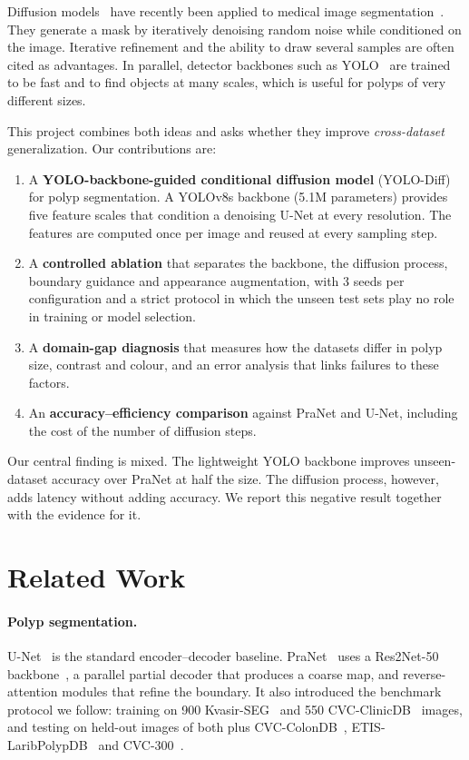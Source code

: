 \documentclass[10pt,twocolumn,letterpaper]{article}
\begin{document}
Diffusion models~\cite{ho2020ddpm,song2021ddim} have recently been applied to medical image segmentation~\cite{amit2021segdiff,wu2023medsegdiff}. They generate a mask by iteratively denoising random noise while conditioned on the image. Iterative refinement and the ability to draw several samples are often cited as advantages. In parallel, detector backbones such as YOLO~\cite{redmon2016yolo,jocher2023yolov8} are trained to be fast and to find objects at many scales, which is useful for polyps of very different sizes.

This project combines both ideas and asks whether they improve \emph{cross-dataset} generalization. Our contributions are:
\begin{enumerate}[nosep,leftmargin=*]
\item A \textbf{YOLO-backbone-guided conditional diffusion model} (YOLO-Diff) for polyp segmentation. A YOLOv8s backbone (5.1M parameters) provides five feature scales that condition a denoising U-Net at every resolution. The features are computed once per image and reused at every sampling step.
\item A \textbf{controlled ablation} that separates the backbone, the diffusion process, boundary guidance and appearance augmentation, with 3 seeds per configuration and a strict protocol in which the unseen test sets play no role in training or model selection.
\item A \textbf{domain-gap diagnosis} that measures how the datasets differ in polyp size, contrast and colour, and an error analysis that links failures to these factors.
\item An \textbf{accuracy--efficiency comparison} against PraNet and U-Net, including the cost of the number of diffusion steps.
\end{enumerate}
Our central finding is mixed. The lightweight YOLO backbone improves unseen-dataset accuracy over PraNet at half the size. The diffusion process, however, adds latency without adding accuracy. We report this negative result together with the evidence for it.

\section{Related Work}
\label{sec:related}

\paragraph{Polyp segmentation.} U-Net~\cite{ronneberger2015unet} is the standard encoder--decoder baseline. PraNet~\cite{fan2020pranet} uses a Res2Net-50 backbone~\cite{gao2021res2net}, a parallel partial decoder that produces a coarse map, and reverse-attention modules that refine the boundary. It also introduced the benchmark protocol we follow: training on 900 Kvasir-SEG~\cite{jha2020kvasir} and 550 CVC-ClinicDB~\cite{bernal2015clinicdb} images, and testing on held-out images of both plus CVC-ColonDB~\cite{tajbakhsh2016colondb}, ETIS-LaribPolypDB~\cite{silva2014etis} and CVC-300~\cite{vazquez2017endoscene}.
\end{document}
